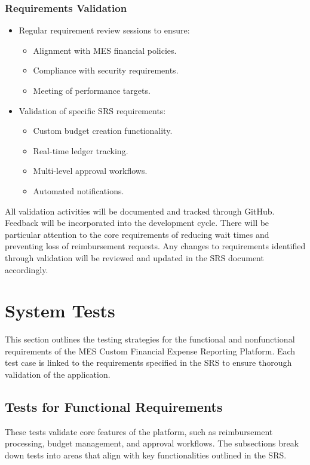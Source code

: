 \documentclass[12pt, titlepage]{article}
\begin{document}
\subsubsection*{Requirements Validation}
\begin{itemize}
   \item Regular requirement review sessions to ensure:
   \begin{itemize}
       \item Alignment with MES financial policies.
       \item Compliance with security requirements.
       \item Meeting of performance targets.
   \end{itemize}
   \item Validation of specific SRS requirements:
   \begin{itemize}
       \item Custom budget creation functionality.
       \item Real-time ledger tracking.
       \item Multi-level approval workflows.
       \item Automated notifications.
   \end{itemize}
\end{itemize}

All validation activities will be documented and tracked through GitHub. Feedback will be incorporated into the development cycle. There will be particular attention to the core requirements of reducing wait times and preventing loss of reimbursement requests. Any changes to requirements identified through validation will be reviewed and updated in the SRS document accordingly.

\section{System Tests}

This section outlines the testing strategies for the functional and nonfunctional requirements of the MES Custom Financial Expense Reporting Platform. Each test case is linked to the requirements specified in the SRS to ensure thorough validation of the application.

\subsection{Tests for Functional Requirements}

These tests validate core features of the platform, such as reimbursement processing, budget management, and approval workflows. The subsections break down tests into areas that align with key functionalities outlined in the SRS.
\end{document}
